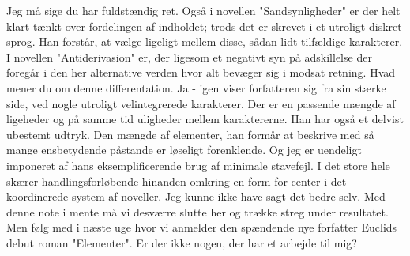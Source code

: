 \documentclass[a4paper,11pt]{article}
\begin{document}
\begin{sketch}
 Jeg må sige du har fuldstændig ret. Også i novellen "Sandsynligheder" er der helt klart tænkt over fordelingen af indholdet; trods det er skrevet i et utroligt diskret sprog. Han forstår, at vælge ligeligt mellem disse, sådan lidt tilfældige karakterer.
 I novellen "Antiderivasion" er, der ligesom et negativt syn på adskillelse der foregår i den her alternative verden hvor alt bevæger sig i modsat retning.  Hvad mener du om denne differentation.
 Ja - igen viser forfatteren sig fra sin stærke side, ved nogle utroligt velintegrerede karakterer. Der er en passende mængde af ligeheder og på samme tid uligheder mellem karaktererne. Han har også et delvist ubestemt udtryk. Den mængde af elementer, han formår at beskrive med så mange ensbetydende påstande er løseligt forenklende. Og jeg er uendeligt imponeret af hans eksemplificerende brug af minimale stavefejl. I det store hele skærer handlingsforløbende hinanden omkring en form for center i det koordinerede system af noveller.
 Jeg kunne ikke have sagt det bedre selv.
 Med denne note i mente må vi desværre slutte her og trække streg under resultatet. Men følg med i næste uge hvor vi anmelder den spændende nye forfatter Euclids debut roman "Elementer".
 Er der ikke nogen, der har et arbejde til mig?

\end{sketch}
\end{document}

